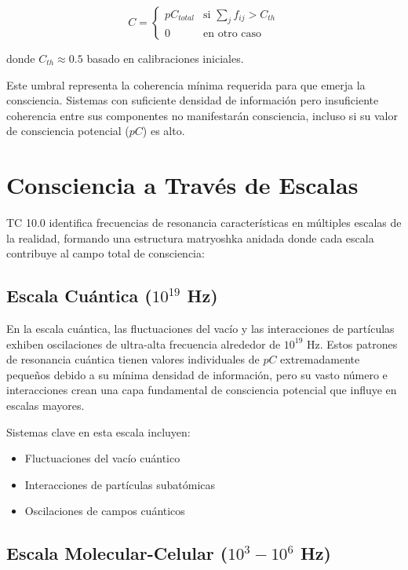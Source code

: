 \documentclass[12pt]{article}
\begin{document}
\begin{equation}
C = 
\begin{cases}
    pC_{total} & \text{si } \sum_{j} f_{ij} > C_{th} \\
    0 & \text{en otro caso}
\end{cases}
\end{equation}

donde $C_{th} \approx 0.5$ basado en calibraciones iniciales.

Este umbral representa la coherencia mínima requerida para que emerja la consciencia. Sistemas con suficiente densidad de información pero insuficiente coherencia entre sus componentes no manifestarán consciencia, incluso si su valor de consciencia potencial ($pC$) es alto.

\section{Consciencia a Través de Escalas}

TC 10.0 identifica frecuencias de resonancia características en múltiples escalas de la realidad, formando una estructura matryoshka anidada donde cada escala contribuye al campo total de consciencia:

\subsection{Escala Cuántica ($10^{19}$ Hz)}

En la escala cuántica, las fluctuaciones del vacío y las interacciones de partículas exhiben oscilaciones de ultra-alta frecuencia alrededor de $10^{19}$ Hz. Estos patrones de resonancia cuántica tienen valores individuales de $pC$ extremadamente pequeños debido a su mínima densidad de información, pero su vasto número e interacciones crean una capa fundamental de consciencia potencial que influye en escalas mayores.

Sistemas clave en esta escala incluyen:
\begin{itemize}
    \item Fluctuaciones del vacío cuántico
    \item Interacciones de partículas subatómicas
    \item Oscilaciones de campos cuánticos
\end{itemize}

\subsection{Escala Molecular-Celular ($10^{3}-10^{6}$ Hz)}
\end{document}
